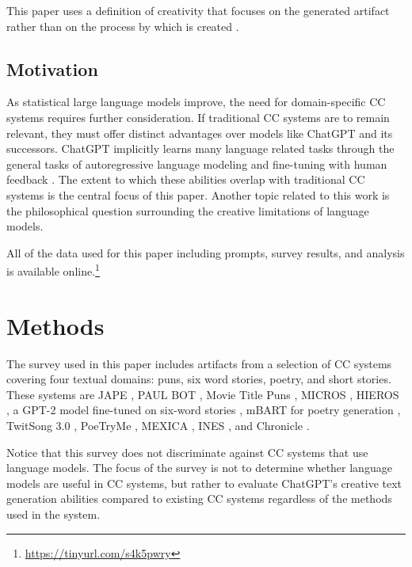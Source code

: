 \documentclass[phd,electronic,oneside,twosidetoc,letterpaper,chaptercenter,parttop,lof]{byumsphd}
\begin{document}
This paper uses a definition of creativity that focuses on the generated artifact rather than on the process by which is created \cite{wiggins2006creativity}.

\subsection{Motivation}

As statistical large language models improve, the need for domain-specific CC systems requires further consideration.
If traditional CC systems are to remain relevant, they must offer distinct advantages over models like ChatGPT and its successors.
ChatGPT implicitly learns many language related tasks through the general tasks of autoregressive language modeling \cite{radford2018gpt2} and fine-tuning with human feedback \cite{ouyang2022instructgpt}.
The extent to which these abilities overlap with traditional CC systems is the central focus of this paper.
Another topic related to this work is the philosophical question surrounding the creative limitations of language models.



All of the data used for this paper including prompts, survey results, and analysis is available online.\footnote{\url{https://tinyurl.com/s4k5pwry}}



\section{Methods}

The survey used in this paper includes artifacts from a selection of CC systems covering four textual domains: puns, six word stories, poetry, and short stories. 
These systems are JAPE \cite{ritchie2003jape}, PAUL BOT \cite{tyler2020puns}, Movie Title Puns \cite{hamalainen2019movie}, MICROS \cite{spendlove2018micros}, HIEROS \cite{spendlove2020hieros}, a GPT-2 model fine-tuned on six-word stories \cite{chiengenerating}, mBART for poetry generation \cite{boggia2022poetry}, TwitSong 3.0 \cite{lamb2019poetry}, PoeTryMe \cite{oliveira2016poetryme}, MEXICA \cite{perez2001mexica}, INES \cite{concepcion2019ines}, and Chronicle \cite{Pickering2017}.

Notice that this survey does not discriminate against CC systems that use language models.
The focus of the survey is not to determine whether language models are useful in CC systems, but rather to evaluate ChatGPT's creative text generation abilities compared to existing CC systems regardless of the methods used in the system.
\end{document}
